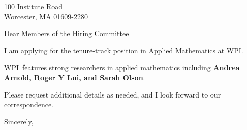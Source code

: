 




	
	
	\def\School{WPI}
	
	\begin{letter}
		{100 Institute Road\\
			Worcester, MA 01609-2280
		}
		
		\opening{Dear Members of the Hiring Committee}
		
		
		I am applying for the tenure-track position in Applied Mathematics at \School. 
		
		\School~features strong researchers in applied mathematics including \textbf{Andrea Arnold, Roger Y Lui, and Sarah Olson}. 
		
		
		
		
		
		Please request additional details as needed, and I look forward to our correspondence.
		
		\closing{Sincerely,}
	\end{letter}
